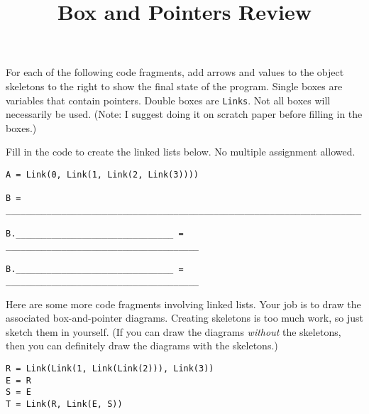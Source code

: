 \documentclass[twoside]{article}
\title{\sc Box and Pointers Review}
\newcommand{\solutionimage}[2]{#2} %
\newcommand{\solutionimage}[2]{#1} %
\begin{document}
\thispagestyle{empty}
\maketitle

\begin{enumerate}

For each of the following code fragments, add arrows and values to the object skeletons to the right to show the final state of the program.  Single boxes are variables that contain pointers.  Double boxes are \lstinline/Links/. Not all boxes will necessarily be used. (Note: I suggest doing it on scratch paper before filling in the boxes.)

\vspace{0.2in}

\solutionimage{}{}

\vspace{0.2in}

Fill in the code to create the linked lists below. No multiple assignment allowed.

\vspace{0.2in}



\vspace{0.2in}

\begin{lstlisting}
A = Link(0, Link(1, Link(2, Link(3))))

B = ______________________________________________________________________

B._______________________________ = ______________________________________

B._______________________________ = ______________________________________
\end{lstlisting}


Here are some more code fragments involving linked lists. Your job is to draw the associated box-and-pointer diagrams. Creating skeletons is too much work, so just sketch them in yourself. (If you can draw the diagrams \textit{without} the skeletons, then you can definitely draw the diagrams with the skeletons.)

\begin{verbatim}
R = Link(Link(1, Link(Link(2))), Link(3))
E = R
S = E
T = Link(R, Link(E, S))
\end{verbatim}


\end{enumerate}
\end{document}
